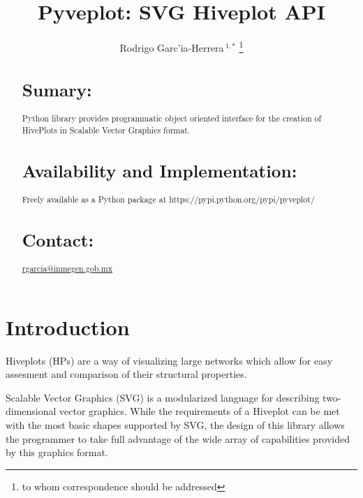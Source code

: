 \documentclass{bioinfo}
\begin{document}

\title[short Title]{Pyveplot: SVG Hiveplot API}
\author[Sample \textit{et~al}]{Rodrigo Garc'ia-Herrera\,$^{1,*}$ \footnote{to whom correspondence should be addressed}}
\address{$^{1}$Department of Bioinformatics, Mexican Institute of
  Genomic Medicine}



\maketitle

\begin{abstract}

\section{Sumary:}
Python library provides programmatic object oriented interface for the creation of
HivePlots in Scalable Vector Graphics format.
\section{Availability and Implementation:}
Freely available as a Python package at
https://pypi.python.org/pypi/pyveplot/

\section{Contact:} \href{rgarcia@inmegen.gob.mx}{rgarcia@inmegen.gob.mx}
\end{abstract}

\section{Introduction}

Hiveplots (HPs) are a way of visualizing large networks which allow
for easy assesment and comparison of their structural properties.
\citealp{Boffelli03}

Scalable Vector Graphics (SVG) is a modularized language for
describing two-dimensional vector graphics. \citealp{McCormack:11:SVG}
While the requirements of a Hiveplot can be met with the most basic
shapes supported by SVG, the design of this library allows the
programmer to take full advantage of the wide array of capabilities
provided by this graphics format. 
\end{document}
